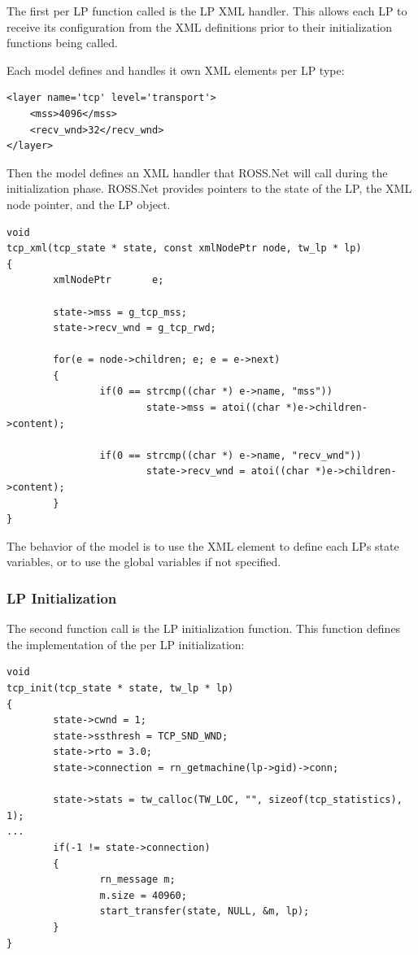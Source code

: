 \documentclass[12pt]{article}
\begin{document}
The first per LP function called is the LP XML handler.  This allows each LP
 to receive its configuration from the XML definitions prior to their
 initialization functions being called.

Each model defines and handles it own XML elements per LP type:

\begin{small}
\begin{verbatim}
<layer name='tcp' level='transport'>
    <mss>4096</mss>
    <recv_wnd>32</recv_wnd>
</layer>
\end{verbatim}
\end{small}

Then the model defines an XML handler that ROSS.Net will call during the
 initialization phase.  ROSS.Net provides pointers to the state of the LP, the
 XML node pointer, and the LP object.

\begin{small}
\begin{verbatim}
void
tcp_xml(tcp_state * state, const xmlNodePtr node, tw_lp * lp)
{
        xmlNodePtr       e;

        state->mss = g_tcp_mss;
        state->recv_wnd = g_tcp_rwd;
        
        for(e = node->children; e; e = e->next)
        {
                if(0 == strcmp((char *) e->name, "mss"))
                        state->mss = atoi((char *)e->children->content);

                if(0 == strcmp((char *) e->name, "recv_wnd"))
                        state->recv_wnd = atoi((char *)e->children->content);
        }
}
\end{verbatim}
\end{small}

The behavior of the model is to use the XML element to define each LPs state variables, or to use the global variables if not specified.
                                                
\subsubsection{LP Initialization}

The second function call is the LP initialization function.  This function defines the implementation of the per LP initialization:

\begin{small}
\begin{verbatim}
void
tcp_init(tcp_state * state, tw_lp * lp)
{
        state->cwnd = 1;
        state->ssthresh = TCP_SND_WND;
        state->rto = 3.0;
        state->connection = rn_getmachine(lp->gid)->conn;

        state->stats = tw_calloc(TW_LOC, "", sizeof(tcp_statistics), 1);
...
        if(-1 != state->connection)
        {
                rn_message m;
                m.size = 40960;
                start_transfer(state, NULL, &m, lp);
        }
}
\end{verbatim}
\end{small}
\end{document}
